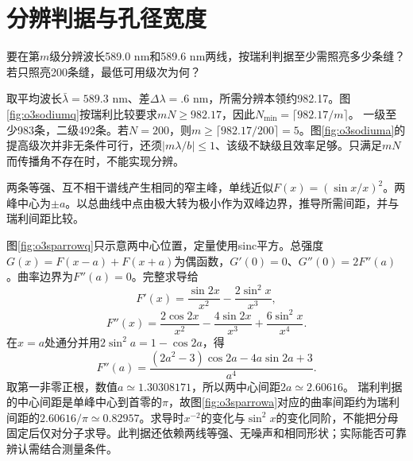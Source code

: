 \section{分辨判据与孔径宽度}
\begin{example}\label{ex:o3sodium}
要在第$m$级分辨波长589.0 nm和589.6 nm两线，按瑞利判据至少需照亮多少条缝？若只照亮200条缝，最低可用级次为何？
\end{example}
\begin{solution}
取平均波长$\bar\lambda=589.3$ nm、差$\Delta\lambda=.6$ nm，所需分辨本领约982.17。图\ref{fig:o3sodiumq}按瑞利比较要求$mN\geq982.17$，因此$N_{\min}=\lceil982.17/m\rceil$。
一级至少983条，二级492条。若$N=200$，则$m\geq\lceil982.17/200\rceil=5$。图\ref{fig:o3sodiuma}的提高级次并非无条件可行，还须$|m\lambda/b|\leq1$、该级不缺级且效率足够。只满足$mN$而传播角不存在时，不能实现分辨。
\end{solution}

\begin{example}\label{ex:o3sparrow}
两条等强、互不相干谱线产生相同的窄主峰，单线近似$F(x)=(\sin x/x)^2$。两峰中心为$\pm a$。以总曲线中点由极大转为极小作为双峰边界，推导所需间距，并与瑞利间距比较。
\end{example}
\begin{solution}
图\ref{fig:o3sparrowq}只示意两中心位置，定量使用sinc平方。总强度$G(x)=F(x-a)+F(x+a)$为偶函数，$G'(0)=0$、$G''(0)=2F''(a)$。曲率边界为$F''(a)=0$。完整求导给
\[
 F'(x)=\frac{\sin2x}{x^2}-\frac{2\sin^2x}{x^3},
\]
\[
 F''(x)=\frac{2\cos2x}{x^2}-\frac{4\sin2x}{x^3}
 +\frac{6\sin^2x}{x^4}.
\]
在$x=a$处通分并用$2\sin^2a=1-\cos2a$，得
\[
 F''(a)=\frac{(2a^2-3)\cos2a-4a\sin2a+3}{a^4}.
\]
取第一非零正根，数值$a\simeq1.30308171$，所以两中心间距$2a\simeq2.60616$。
瑞利判据的中心间距是单峰中心到首零的$\pi$，故图\ref{fig:o3sparrowa}对应的曲率间距约为瑞利间距的$2.60616/\pi\simeq0.82957$。求导时$x^{-2}$的变化与$\sin^2x$的变化同阶，不能把分母固定后仅对分子求导。此判据还依赖两线等强、无噪声和相同形状；实际能否可靠辨认需结合测量条件。
\end{solution}

